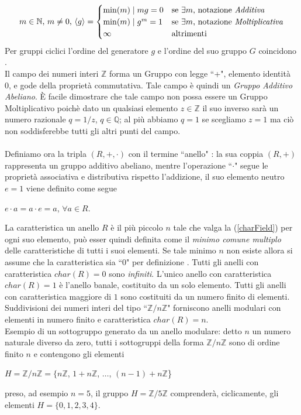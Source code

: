 \documentclass[a4paper,12pt]{tesiinfo}
\begin{document}
\begin{gather}
m \in \mathbb{N}\text{, }m \ne 0 \text{, }\langle g \rangle = 
\begin{cases} 
\min (m) \mid mg = 0 & \mbox{se }\exists m \text{, notazione \textit{Additiva}}\\
\min (m) \mid g^m = 1 & \mbox{se }\exists m \text{, notazione \textit{Moltiplicativa}}\\
\infty & \mbox{altrimenti}\\
\end{cases}
\label{ordineGeneratoreGruppo}
\end{gather}
Per gruppi ciclici l'ordine del generatore $g$ e l'ordine del suo gruppo $G$ coincidono \cite{char_Ring}.
\\
Il campo dei numeri interi $\mathbb{Z}$ forma un Gruppo con legge ``+", elemento identit\`a 0, e gode della propriet\`a commutativa. Tale campo \`e quindi un \textit{Gruppo Additivo Abeliano}. \`E facile dimostrare che tale campo non possa essere un Gruppo Moltiplicativo poich\`e dato un qualsiasi elemento $z \in \mathbb{Z}$ il suo inverso sar\`a un numero razionale $q = 1 / z$, $q \in \mathbb{Q}$; al pi\`u abbiamo $q=1$ se scegliamo $z=1$ ma ci\`o non soddisferebbe tutti gli altri punti del campo.
\\
\\
Definiamo ora la tripla $(R, +, \cdot)$ con il termine ``anello" \cite{anelli1}: la sua coppia $(R, +)$ rappresenta un gruppo additivo abeliano, mentre l'operazione ``$\cdot$" segue le propriet\`a associativa e distributiva rispetto l'addizione, il suo elemento neutro $e=1$ viene definito come segue
\begin{center}
 $e\cdot a = a\cdot e = a$, $\forall a \in R$.%
\end{center}
%
%
%
La caratteristica un anello $R$ \`e il pi\`u piccolo $n$ tale che valga la (\ref{charField}) per ogni suo elemento, pu\`o esser quindi definita come il \textit{minimo comune multiplo} delle caratteristiche di tutti i suoi elementi. Se tale minimo $n$ non esiste allora si assume che la caratteristica sia ``0" per definizione \cite{char_Ring}. Tutti gli anelli con caratteristica $char(R)=0$ sono \textit{infiniti}. 
L'unico anello con caratteristica $char(R)=1$ \`e l'anello banale, costituito da un solo elemento. 
Tutti gli anelli con caratteristica maggiore di $1$ sono costituiti da un numero finito di elementi. Suddivisioni dei numeri interi del tipo ``$\mathbb{Z}/n\mathbb{Z}$" forniscono anelli modulari con elementi in numero finito e caratteristica $char(R) = n$.
\\
Esempio di un sottogruppo generato da un anello modulare: detto $n$ un numero naturale diverso da zero, tutti i sottogruppi della forma $\mathbb{Z}/n\mathbb{Z}$ sono di ordine finito $n$ e contengono gli elementi
\begin{center}
 $H=\mathbb{Z}/n\mathbb{Z}=\{n\mathbb{Z}$, $ 1+n\mathbb{Z}$, $\ldots $, $(n-1)+n\mathbb{Z}$\}
 \\
\end{center}
preso, ad esempio $n=5$, il gruppo $H = \mathbb{Z}/5\mathbb{Z}$ comprender\`a, ciclicamente, gli elementi $H= \{0, 1, 2, 3, 4\}$.
%
%
%
\end{document}
